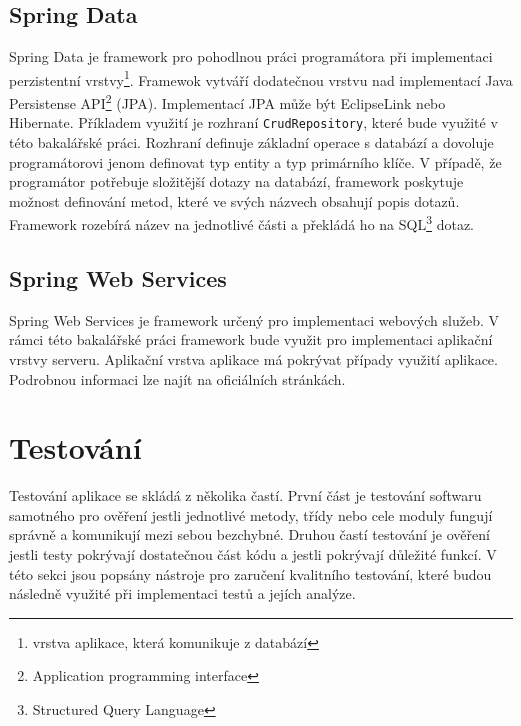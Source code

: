     \subsection{Spring Data}
        Spring Data je framework pro pohodlnou práci programátora při implementaci perzistentní vrstvy\footnote{vrstva aplikace, která komunikuje z databází}. Framewok vytváří dodatečnou vrstvu nad implementací Java Persistense API\footnote{Application programming interface} (JPA). Implementací JPA může být EclipseLink nebo Hibernate. Příkladem využití je rozhraní \texttt{CrudRepository}, které bude využité v této bakalářské práci. Rozhraní definuje základní operace s databází a dovoluje programátorovi jenom definovat typ entity a typ primárního klíče. V případě, že programátor potřebuje složitější dotazy na databází, framework poskytuje možnost definování metod, které ve svých názvech obsahují popis dotazů. Framework rozebírá název na jednotlivé části a překládá ho na SQL\footnote{Structured Query Language} dotaz.
    
    \subsection{Spring Web Services}
        Spring Web Services je framework určený pro implementaci webových služeb. V rámci této bakalářské práci framework bude využit pro implementaci aplikační vrstvy serveru. Aplikační vrstva aplikace má pokrývat případy využití aplikace. Podrobnou informaci lze najít na oficiálních stránkách\cite{spring-web-services}.
        

    
\section{Testování}\label{resere:testovani}
    Testování aplikace se skládá z několika častí. První část je testování softwaru samotného pro ověření jestli jednotlivé metody, třídy nebo cele moduly fungují správně a komunikují mezi sebou bezchybné. Druhou častí testování je ověření jestli testy pokrývají dostatečnou část kódu a jestli pokrývají důležité funkcí. V této sekci jsou popsány nástroje pro zaručení kvalitního testování, které budou následně využité při implementaci testů a jejích analýze.
    
